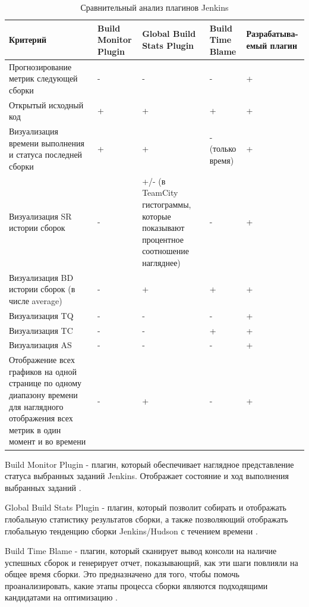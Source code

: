 \begin{table}
    \centering
    \caption{Сравнительный анализ плагинов Jenkins}
    \begin{tabular}{|p{5cm}|p{2cm}|p{3cm}|p{2cm}|p{3cm}|}
    \hline
        Критерий & Build Monitor Plugin \cite{buildmonitor} & Global Build Stats Plugin \cite{gstats} & Build Time Blame \cite{buildblame} & Разрабатыва-\linebreak емый плагин  \\ \hline
        Прогнозирование метрик следующей сборки  & - & - & - & +  \\ \hline
        Открытый исходный код  & + &+ & + & +  \\ \hline
        Визуализация времени выполнения и статуса последней сборки & + &+ & - (только время) &+  \\ \hline
        Визуализация SR истории сборок & - & +/- (в TeamCity гистограммы, которые показывают процентное соотношение нагляднее) & - & +  \\ \hline
       Визуализация BD истории сборок (в числе average) & - & + & +  & +  \\ \hline
       Визуализация TQ & - & - & -  &+  \\ \hline
      Визуализация TC & - & - & +  & +  \\ \hline
      Визуализация AS & - &- &-  & +  \\ \hline
       Отображение всех графиков на одной странице по одному диапазону времени для наглядного отображения всех метрик в один момент и во времени & - & + & -  & +  \\ \hline


    \end{tabular}
\end{table}	

 Build Monitor Plugin - плагин, который обеспечивает наглядное представление статуса выбранных заданий Jenkins. Отображает состояние и ход выполнения выбранных заданий \cite{buildmonitor}.
 
 Global Build Stats Plugin - плагин, который позволит собирать и отображать глобальную статистику результатов сборки, а также позволяющий отображать глобальную тенденцию сборки Jenkins/Hudson с течением времени  \cite{gstats}.
 
  Build Time Blame - плагин, который сканирует вывод консоли на наличие успешных сборок и генерирует отчет, показывающий, как эти шаги повлияли на общее время сборки. Это предназначено для того, чтобы помочь проанализировать, какие этапы процесса сборки являются подходящими кандидатами на оптимизацию  \cite{buildblame}.
  
